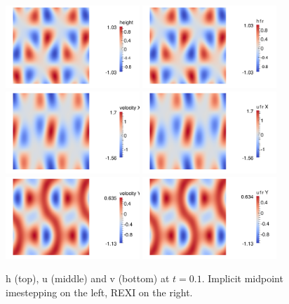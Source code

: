 \documentclass[14pt]{article}
\begin{document}
\begin{figure}
  \centering
  \includegraphics[width=0.45\textwidth]{results/t0.1/IM_h}
  \includegraphics[width=0.45\textwidth]{results/t0.1/rexi_h}\\
  \includegraphics[width=0.45\textwidth]{results/t0.1/IM_u}
  \includegraphics[width=0.45\textwidth]{results/t0.1/rexi_u}\\
  \includegraphics[width=0.45\textwidth]{results/t0.1/IM_v}
  \includegraphics[width=0.45\textwidth]{results/t0.1/rexi_v}
\caption{h (top), u (middle) and v (bottom) at $t=0.1$. Implicit midpoint imestepping on the left, REXI on the right.}
\end{figure}
\end{document}
